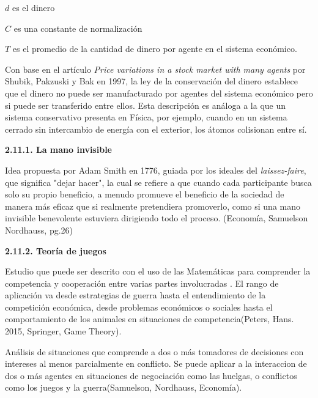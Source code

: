 $d$ es el dinero

$C$ es una constante de normalización

$\mathit{T}$ es el promedio de la cantidad de dinero por agente en el sistema económico.

Con base en el artículo \textit{Price variations in a stock market with many agents} por Shubik, Pakzuski y Bak en 1997, la ley de la conservación del dinero establece que el dinero no puede ser manufacturado por agentes del sistema económico pero si puede ser transferido entre ellos. Esta descripción es análoga a la que un sistema conservativo presenta en Física, por ejemplo, cuando en un sistema cerrado sin intercambio de energía con el exterior, los átomos colisionan entre sí. 
\newpage




{
\noindent
\Large  \textbf{2.11.1. La mano invisible} 
}

Idea propuesta por Adam Smith en  1776, guiada por los ideales del \textit{laissez-faire}, que significa "dejar hacer", la cual se refiere a que cuando cada participante busca solo su propio beneficio, a menudo promueve el beneficio de la sociedad de manera más eficaz que si realmente pretendiera promoverlo, como si una mano invisible benevolente estuviera dirigiendo todo el proceso. (Economía, Samuelson Nordhauss, pg.26)
\newline



{
\noindent
\Large  \textbf{2.11.2. Teoría de juegos} 
}

Estudio que puede ser descrito con el uso de las Matemáticas para comprender la competencia y cooperación entre varias partes involucradas . El rango de aplicación va desde estrategias de guerra hasta el entendimiento de la competición económica, desde problemas económicos o sociales hasta el comportamiento de los animales en situaciones de competencia(Peters, Hans. 2015, Springer, Game Theory).

Análisis de situaciones que comprende a dos o más tomadores de decisiones con intereses al menos parcialmente en conflicto. Se puede aplicar a la interaccion de dos o más agentes en situaciones de negociación como las huelgas, o conflictos como los juegos y la guerra(Samuelson, Nordhauss, Economía).


